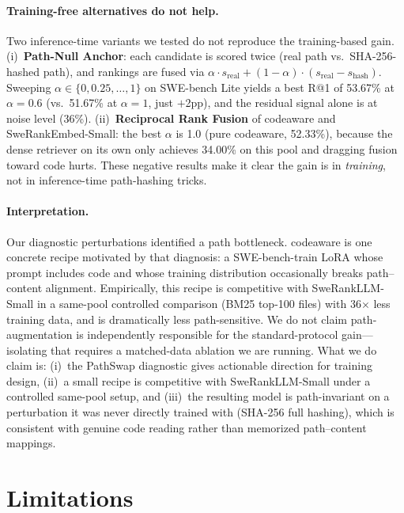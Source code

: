 \documentclass{article}
\begin{document}
\paragraph{Training-free alternatives do not help.}
Two inference-time variants we tested do not reproduce the training-based gain.
(i)~\textbf{Path-Null Anchor}: each candidate is scored twice (real path vs.\ SHA-256-hashed path), and rankings are fused via $\alpha \cdot s_{\text{real}} + (1-\alpha)\cdot (s_{\text{real}} - s_{\text{hash}})$. Sweeping $\alpha \in \{0, 0.25, \ldots, 1\}$ on SWE-bench Lite yields a best R@1 of 53.67\% at $\alpha{=}0.6$ (vs.\ 51.67\% at $\alpha{=}1$, just $+$2pp), and the residual signal alone is at noise level (36\%).
(ii)~\textbf{Reciprocal Rank Fusion} of codeaware and SweRankEmbed-Small: the best $\alpha$ is 1.0 (pure codeaware, 52.33\%), because the dense retriever on its own only achieves 34.00\% on this pool and dragging fusion toward code hurts.
These negative results make it clear the gain is in \emph{training}, not in inference-time path-hashing tricks.

\paragraph{Interpretation.}
Our diagnostic perturbations identified a path bottleneck. codeaware is one concrete recipe motivated by that diagnosis: a SWE-bench-train LoRA whose prompt includes code and whose training distribution occasionally breaks path--content alignment. Empirically, this recipe is competitive with SweRankLLM-Small in a same-pool controlled comparison (BM25 top-100 files) with 36$\times$ less training data, and is dramatically less path-sensitive. We do not claim path-augmentation is independently responsible for the standard-protocol gain---isolating that requires a matched-data ablation we are running. What we do claim is: (i)~the PathSwap diagnostic gives actionable direction for training design, (ii)~a small recipe is competitive with SweRankLLM-Small under a controlled same-pool setup, and (iii)~the resulting model is path-invariant on a perturbation it was never directly trained with (SHA-256 full hashing), which is consistent with genuine code reading rather than memorized path--content mappings.

\section{Limitations}
\label{sec:limitations}
\end{document}
